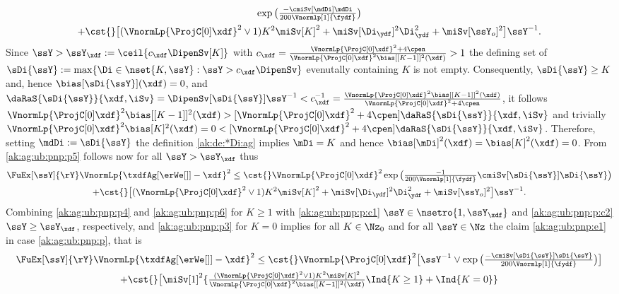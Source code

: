 \begin{pro}
\begin{multline}
    \exp\big(\tfrac{-\cmiSv[\mdDi]\mdDi}{200\Vnormlp[1]{\fydf}}\big)\\
    +\cst{}\big[(\VnormLp{\ProjC[0]\xdf}^2\vee1)K^2\miSv[K]^2
    +\miSv[\Di_{\ydf}]^2\Di_{\ydf}^2+\miSv[\ssY_{o}]^2 \big]\ssY^{-1}.
\end{multline}
Since
$\ssY> \ssY_{\xdf}:=\ceil{c_{\xdf}\DipenSv[K]}$ with
$c_{\xdf}=\tfrac{\VnormLp{\ProjC[0]\xdf}^2+4\cpen}{\VnormLp{\ProjC[0]\xdf}^2\bias[{[K-1]}]^2(\xdf)}>1$
the defining set of
$\sDi{\ssY}:=\max\{\Di\in\nset{K,\ssY}:\ssY>c_{\xdf}\DipenSv\}$
evenutally containing $K$ is not empty. Consequently,  $\sDi{\ssY}\geq
K$ and, hence 
$\bias[\sDi{\ssY}](\xdf)=0$, and
$\daRaS{\sDi{\ssY}}{\xdf,\iSv}=\DipenSv[\sDi{\ssY}]\ssY^{-1}<c_{\xdf}^{-1}=\tfrac{\VnormLp{\ProjC[0]\xdf}^2\bias[{[K-1]}]^2(\xdf)}{\VnormLp{\ProjC[0]\xdf}^2+4\cpen}$,
it follows
$\VnormLp{\ProjC[0]\xdf}^2\bias[{[K-1]}]^2(\xdf)>[\VnormLp{\ProjC[0]\xdf}^2+4\cpen]\daRaS{\sDi{\ssY}}{\xdf,\iSv}$
and trivially
$\VnormLp{\ProjC[0]\xdf}^2\bias[{K}]^2(\xdf)=0<[\VnormLp{\ProjC[0]\xdf}^2+4\cpen]\daRaS{\sDi{\ssY}}{\xdf,\iSv}$. Therefore,
setting $\mdDi:=\sDi{\ssY}$ the definition \eqref{ak:de:*Di:ag}
implies $\mDi=K$ and hence
$\bias[\mDi]^2(\xdf)=\bias[K]^2(\xdf)=0$. From \eqref{ak:ag:ub:pnp:p5}  follows
now for all $\ssY> \ssY_{\xdf}$ thus
\begin{multline}\label{ak:ag:ub:pnp:p6}
  \FuEx[\ssY]{\rY}\VnormLp{\txdfAg[{\erWe[]}]-\xdf}^2\leq  \cst{}\VnormLp{\ProjC[0]\xdf}^2\exp\big(\tfrac{-1}{200\Vnormlp[1]{\fydf}}\cmiSv[\sDi{\ssY}]\sDi{\ssY}\big)\\
  +\cst{}\big[(\VnormLp{\ProjC[0]\xdf}^2\vee1)K^2\miSv[K]^2
  +\miSv[\Di_{\ydf}]^2\Di_{\ydf}^2+\miSv[\ssY_{o}]^2 \big]\ssY^{-1}.
\end{multline}
Combining \eqref{ak:ag:ub:pnp:p4} and
    \eqref{ak:ag:ub:pnp:p6}  for $K\geq1$ with \ref{ak:ag:ub:pnp:p:c1}
$\ssY\in\nsetro{1,\ssY_{\xdf}}$ and \ref{ak:ag:ub:pnp:p:c2}
$\ssY\geq \ssY_{\xdf}$, respectively, and \eqref{ak:ag:ub:pnp:p3}  for
$K=0$ implies for all $K\in\Nz_0$ and for all $\ssY\in\Nz$ the claim
\eqref{ak:ag:ub:pnp:e1} in case \ref{ak:ag:ub:pnp:p}, that is
\begin{multline}\label{ak:ag:ub:pnp:p7}
  \FuEx[\ssY]{\rY}\VnormLp{\txdfAg[{\erWe[]}]-\xdf}^2\leq
  \cst{}\VnormLp{\ProjC[0]\xdf}^2\big[  \ssY^{-1}\vee\exp\big(\tfrac{-\cmiSv[\sDi{\ssY}]\sDi{\ssY}}{200\Vnormlp[1]{\fydf}}\big)\big]\\
  +\cst{}\big[\miSv[1]^2\{\tfrac{(\VnormLp{\ProjC[0]\xdf}^2\vee1)K^2\miSv[K]^2}{\VnormLp{\ProjC[0]\xdf}^2\bias[{[K-1]}]^2(\xdf)}\Ind{K\geq1}+\Ind{K=0}\}

\end{multline}
\end{pro}
